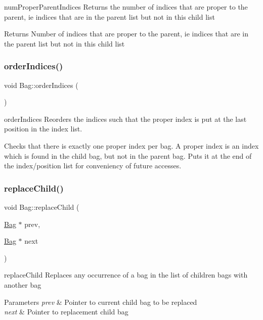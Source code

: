 num\+Proper\+Parent\+Indices Returns the number of indices that are proper to the parent, ie indices that are in the parent list but not in this child list 

\begin{DoxyReturn}{Returns}
Number of indices that are proper to the parent, ie indices that are in the parent list but not in this child list 
\end{DoxyReturn}
\mbox{\label{class_bag_a8dfb102ead7412437b5f69b582784e44}} 
\subsubsection{\texorpdfstring{order\+Indices()}{orderIndices()}}
{\footnotesize\ttfamily void Bag\+::order\+Indices (\begin{DoxyParamCaption}{ }\end{DoxyParamCaption})}



order\+Indices Reorders the indices such that the proper index is put at the last position in the index list. 

Checks that there is exactly one proper index per bag. A proper index is an index which is found in the child bag, but not in the parent bag. Puts it at the end of the index/position list for conveniency of future accesses. \mbox{\label{class_bag_ade9c24ae6e76c2e0c27bc5b51929f64a}} 
\subsubsection{\texorpdfstring{replace\+Child()}{replaceChild()}}
{\footnotesize\ttfamily void Bag\+::replace\+Child (\begin{DoxyParamCaption}\item[{\hyperlink{class_bag}{Bag} $\ast$}]{prev,  }\item[{\hyperlink{class_bag}{Bag} $\ast$}]{next }\end{DoxyParamCaption})}



replace\+Child Replaces any occurrence of a bag in the list of children bags with another bag 


\begin{DoxyParams}{Parameters}
{\em prev} & Pointer to current child bag to be replaced \\
\hline
{\em next} & Pointer to replacement child bag \\
\hline
\end{DoxyParams}
\mbox{\label{class_bag_aab06a56e08bd48cdce2e72d3b56d19f5}} 
